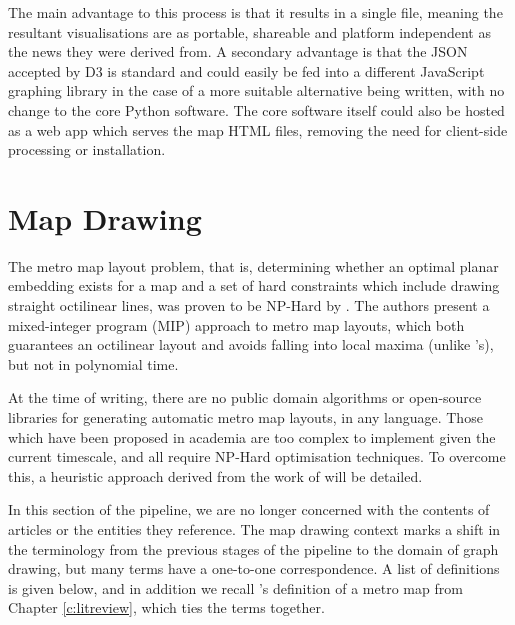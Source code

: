 The main advantage to this process is that it results in a single file, meaning the resultant visualisations are as portable, shareable and platform independent as the news they were derived from. A secondary advantage is that the JSON accepted by D3 is standard and could easily be fed into a different JavaScript graphing library in the case of a more suitable alternative being written, with no change to the core Python software. The core software itself could also be hosted as a web app which serves the map HTML files, removing the need for client-side processing or installation.

\clearpage
\section{Map Drawing}

The metro map layout problem, that is, determining whether an optimal planar embedding exists for a map and a set of hard constraints which include drawing straight octilinear lines, was proven to be NP-Hard by \cite{AutomatedDrawingOfMetroMaps}. The authors present a mixed-integer program (MIP) approach to metro map layouts, which both guarantees an octilinear layout and avoids falling into local maxima (unlike \citeauthor{AutomaticMetroMapLayoutThesis}'s), but not in polynomial time.

At the time of writing, there are no public domain algorithms or open-source libraries for generating automatic metro map layouts, in any language. Those which have been proposed in academia \citep{AutomaticMetroMapLayoutThesis, AutomatedDrawingOfMetroMaps} are too complex to implement given the current timescale, and all require NP-Hard optimisation techniques. To overcome this, a heuristic approach derived from the work of \citep{AutomaticMetroMapLayoutThesis, AutomaticMetroMapLayout, WhichAesthetic} will be detailed.

In this section of the pipeline, we are no longer concerned with the contents of articles or the entities they reference. The map drawing context marks a shift in the terminology from the previous stages of the pipeline to the domain of graph drawing, but many terms have a one-to-one correspondence. A list of definitions is given below, and in addition we recall \citeauthor{GeneratingInformationMaps}'s definition of a metro map from Chapter \ref{c:litreview}, which ties the terms together.

